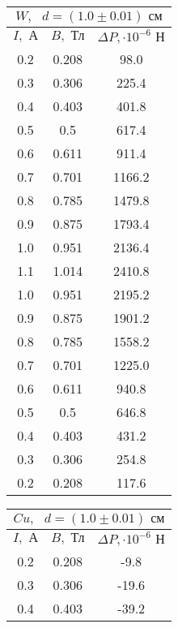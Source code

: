 \documentclass[a4paper,12pt]{article} %
\begin{document}
\begin{table}[h]
	\centering
	\begin{tabular}{|c|c|c|}
		\hline
            \multicolumn{3}{|c|}{$W, \text{ } d = (1.0 \pm 0.01) \text{ см}$} \\ \hline
            \hline
		$ I, \text{ А}$ & $ B, \text{ Тл}$ & $\Delta P, \cdot10^{-6}\text{ Н}$ \\ \hline
		0.2 & 0.208 & 98.0 \\ \hline
            0.3 & 0.306 & 225.4 \\ \hline
            0.4 & 0.403 & 401.8 \\ \hline
            0.5 & 0.5 & 617.4 \\ \hline
            0.6 & 0.611 & 911.4 \\ \hline
            0.7 & 0.701 & 1166.2 \\ \hline
            0.8 & 0.785 & 1479.8 \\ \hline
            0.9 & 0.875 & 1793.4 \\ \hline
            1.0 & 0.951 & 2136.4 \\ \hline
            1.1 & 1.014 & 2410.8 \\ \hline
            1.0 & 0.951 & 2195.2 \\ \hline
            0.9 & 0.875 & 1901.2 \\ \hline
            0.8 & 0.785 & 1558.2 \\ \hline
            0.7 & 0.701 & 1225.0 \\ \hline
            0.6 & 0.611 & 940.8 \\ \hline
            0.5 & 0.5 & 646.8 \\ \hline
            0.4 & 0.403 & 431.2 \\ \hline
            0.3 & 0.306 & 254.8 \\ \hline
            0.2 & 0.208 & 117.6 \\ \hline
	\end{tabular}
        \begin{tabular}{|c|c|c|}
		\hline
            \multicolumn{3}{|c|}{$Cu, \text{ } d = (1.0 \pm 0.01) \text{ см}$} \\ \hline
            \hline
		$ I, \text{ А}$ & $ B, \text{ Тл}$ & $\Delta P, \cdot10^{-6}\text{ Н}$ \\ \hline
		0.2 & 0.208 & -9.8 \\ \hline
            0.3 & 0.306 & -19.6 \\ \hline
            0.4 & 0.403 & -39.2 \\ \hline

\end{tabular}
\end{table}
\end{document}
